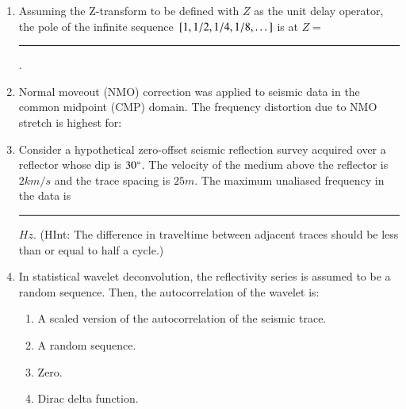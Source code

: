 \documentclass[journal,12pt,onecolumn]{IEEEtran}
\theoremstyle{remark}
\begin{document}
\begin{enumerate}
    \item Assuming the Z-transform to be defined with $Z$ as the unit delay operator, the pole of the infinite sequence ${}\left[1,1/2,1/4,1/8,\dots\right]$ is at $Z = $ \rule{3cm}{0.15mm}. \hfill{}
    
    \item Normal moveout (NMO) correction was applied to seismic data in the common midpoint (CMP) domain. The frequency distortion due to NMO stretch is highest for: \hfill{}
                \begin{enumerate}
                \end{enumerate}
    
    \item Consider a hypothetical zero-offset seismic reflection survey acquired over a reflector whose dip is $30\degree$. The velocity of the medium above the reflector is $2 km/s$ and the trace spacing is $25 m$. The maximum unaliased frequency in the data is \rule{3cm}{0.15mm} $Hz$. (HInt: The difference in traveltime between adjacent traces should be less than or equal to half a cycle.) \hfill{}
    
    \item In statistical wavelet deconvolution, the reflectivity series is assumed to be a random sequence. Then, the autocorrelation of the wavelet is: \hfill{}
                \begin{enumerate}
                        \item A scaled version of the autocorrelation of the seismic trace.
                        \item A random sequence.
                        \item Zero.
                        \item  Dirac delta function.
                \end{enumerate}
                

\end{enumerate}
\end{document}
